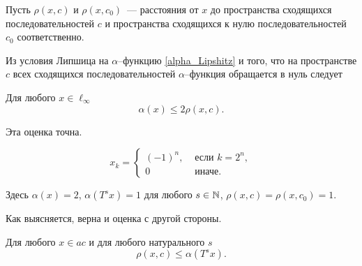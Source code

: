 Пусть $\rho(x,c)$ и $\rho(x,c_0)$~--- расстояния от $x$ до пространства сходящихся последовательностей $c$
и пространства сходящихся к нулю последовательностей $c_0$ соответственно.

Из условия Липшица на $\alpha$--функцию \eqref{alpha_Lipshitz}
и того, что на пространстве $c$
всех сходящихся последовательностей
$\alpha$--функция обращается в нуль следует

\begin{lemma}
\label{thm:alpha_x_leq_2_rho_x_c}
	Для любого $x\in\ell_\infty$
	\begin{equation}
		\alpha(x) \leq 2\rho(x, c)
		.
	\end{equation}
\end{lemma}


Эта оценка точна.
\begin{example}
\label{ex:alpha_ac_rho_x_c}
	\begin{equation}
	\label{eq:alpha_ac_distance_example_y}
		x_k = \begin{cases}
			(-1)^n, &\mbox{~если~} k = 2^n,
			\\
			0 &\mbox{~иначе.}
		\end{cases}
	\end{equation}
\end{example}
Здесь $\alpha(x) = 2$, $\alpha(T^s x) = 1$ для любого $s\in\mathbb{N}$, $\rho(x,c) = \rho(x, c_0) = 1$.

Как выясняется, верна и оценка с другой стороны.

\begin{lemma}
\label{thm:rho_x_c_leq_alpha_t_s_x}
	Для любого $x\in ac$ и для любого натурального $s$
	\begin{equation}
		\rho(x,c)\leq \alpha(T^s x)
		.
	\end{equation}
\end{lemma}

